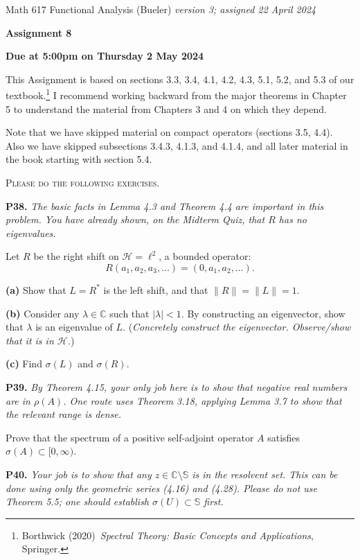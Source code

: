 \documentclass[12pt]{amsart}
\newcommand{\cH}{\mathcal{H}}
\newcommand{\CC}{\mathbb{C}}
\newcommand{\prob}[1]{\bigskip\noindent\textbf{#1.}\quad }
\newcommand{\epart}[1]{\medskip\noindent\textbf{(#1)}\quad }
\begin{document}
\scriptsize \noindent Math 617 Functional Analysis (Bueler) \hfill \emph{version 3; assigned 22 April 2024}
\normalsize\medskip

\Large\centerline{\textbf{Assignment 8}}
\large
\medskip

\centerline{\textbf{Due at 5:00pm on Thursday 2 May 2024}}
\medskip
\normalsize

\thispagestyle{empty}

\bigskip
\noindent This Assignment is based on sections 3.3, 3.4, 4.1, 4.2, 4.3, 5.1, 5.2, and 5.3 of our textbook.\footnote{Borthwick (2020)~\emph{Spectral Theory: Basic Concepts and Applications}, Springer.}  I recommend working backward from the major theorems in Chapter 5 to understand the material from Chapters 3 and 4 on which they depend.

\bigskip
\noindent Note that we have skipped material on compact operators (sections 3.5, 4.4).  Also we have skipped subsections 3.4.3, 4.1.3, and 4.1.4, and all later material in the book starting with section 5.4.

\medskip
\noindent \textsc{Please do the following exercises.}
\smallskip

\renewcommand{\SS}{\mathbb{S}}


\prob{P38}  \emph{The basic facts in Lemma 4.3 and Theorem 4.4 are important in this problem.  You have already shown, on the Midterm Quiz, that $R$ has no eigenvalues.}

\medskip\noindent Let $R$ be the right shift on $\cH=\ell^2$, a bounded operator:
	$$R (a_1,a_2,a_3,\dots) = (0,a_1,a_2,\dots).$$

\epart{a}  Show that $L=R^*$ is the left shift, and that $\|R\|=\|L\|=1$.

\epart{b}  Consider any $\lambda\in\CC$ such that $|\lambda|<1$.  By constructing an eigenvector, show that $\lambda$ is an eigenvalue of $L$.  (\emph{Concretely construct the eigenvector.  Observe/show that it is in $\cH$.})

\epart{c}  Find $\sigma(L)$ and $\sigma(R)$.


\prob{P39}  \emph{By Theorem 4.15, your only job here is to show that negative real numbers are in $\rho(A)$.  One route uses Theorem 3.18, applying Lemma 3.7 to show that the relevant range is dense.}

\medskip\noindent Prove that the spectrum of a positive self-adjoint operator $A$ satisfies $\sigma(A) \subset [0,\infty)$.


\prob{P40}  \emph{Your job is to show that any $z\in\CC\setminus \SS$ is in the resolvent set.  This can be done using only the geometric series (4.16) and (4.28).  Please do not use Theorem 5.5; one should establish $\sigma(U) \subset \SS$ first.}
\end{document}
